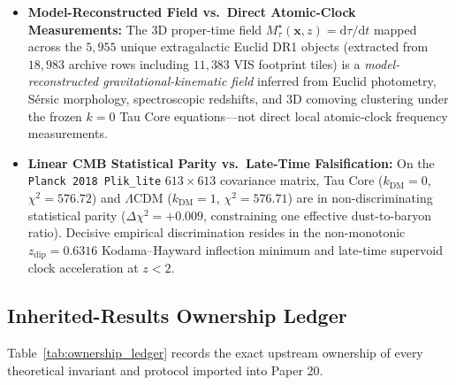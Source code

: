 \documentclass[11pt,a4paper]{article}
\begin{document}
\begin{itemize}
  \item \textbf{Model-Reconstructed Field vs.\ Direct Atomic-Clock Measurements:} The 3D proper-time field $M_\tau^\star(\mathbf{x}, z) = \mathrm{d}\tau/\mathrm{d}t$ mapped across the $5,955$ unique extragalactic Euclid DR1 objects (extracted from $18,983$ archive rows including $11,383$ VIS footprint tiles) is a \emph{model-reconstructed gravitational-kinematic field} inferred from Euclid photometry, S\'ersic morphology, spectroscopic redshifts, and 3D comoving clustering under the frozen $k=0$ Tau Core equations---not direct local atomic-clock frequency measurements.
  \item \textbf{Linear CMB Statistical Parity vs.\ Late-Time Falsification:} On the \texttt{Planck 2018 Plik\_lite} $613\times 613$ covariance matrix, Tau Core ($k_{\mathrm{DM}} = 0$, $\chi^2 = 576.72$) and $\Lambda\mathrm{CDM}$ ($k_{\mathrm{DM}} = 1$, $\chi^2 = 576.71$) are in non-discriminating statistical parity ($\Delta\chi^2 = +0.009$, constraining one effective dust-to-baryon ratio). Decisive empirical discrimination resides in the non-monotonic $z_{\mathrm{dip}} = 0.6316$ Kodama--Hayward inflection minimum and late-time supervoid clock acceleration at $z < 2$.
\end{itemize}

\subsection{Inherited-Results Ownership Ledger}

Table~\ref{tab:ownership_ledger} records the exact upstream ownership of every theoretical invariant and protocol imported into Paper 20.
\end{document}
